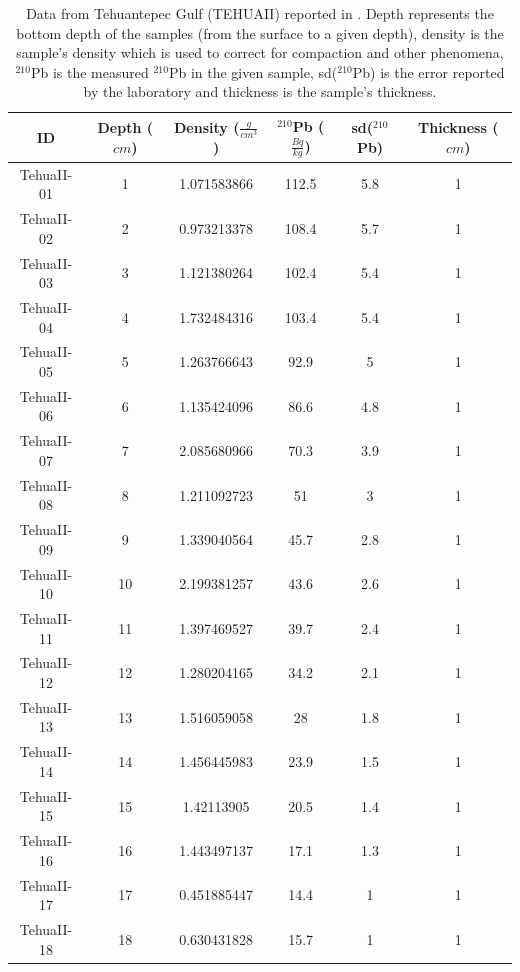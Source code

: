 \documentclass [10pt] {article}
\begin{document}
\begin{table}
\centering
    \begin{tabular}{|c| c| c| c| c| c|}
\hline
	    ID  & Depth ($cm$)  & Density ($\frac{g}{cm^3}$)  & $^{210}$Pb ($\frac{Bq}{kg}$) & sd($^{210}$Pb)  & Thickness ($cm$) \\
\hline
TehuaII-01  & 1  & 1.071583866  & 112.5  & 5.8  & 1\\
TehuaII-02  & 2  & 0.973213378  & 108.4  & 5.7  & 1\\
TehuaII-03  & 3  & 1.121380264  & 102.4  & 5.4  & 1\\
TehuaII-04  & 4  & 1.732484316  & 103.4  & 5.4  & 1\\
TehuaII-05  & 5  & 1.263766643  & 92.9  & 5  & 1\\
TehuaII-06  & 6  & 1.135424096  & 86.6  & 4.8  & 1\\
TehuaII-07  & 7  & 2.085680966  & 70.3  & 3.9  & 1\\
TehuaII-08  & 8  & 1.211092723  & 51  & 3  & 1\\
TehuaII-09  & 9  & 1.339040564  & 45.7  & 2.8  & 1\\
TehuaII-10  & 10  & 2.199381257  & 43.6  & 2.6  & 1\\
TehuaII-11  & 11  & 1.397469527  & 39.7  & 2.4  & 1\\
TehuaII-12  & 12  & 1.280204165  & 34.2  & 2.1  & 1\\
TehuaII-13  & 13  & 1.516059058  & 28  & 1.8  & 1\\
TehuaII-14  & 14  & 1.456445983  & 23.9  & 1.5  & 1\\
TehuaII-15  & 15  & 1.42113905  & 20.5  & 1.4  & 1\\
\hline
TehuaII-16  & 16  & 1.443497137  & 17.1  & 1.3  & 1\\
TehuaII-17  & 17  & 0.451885447  & 14.4  & 1  & 1\\
TehuaII-18  & 18  & 0.630431828  & 15.7  & 1  & 1\\
\hline
    \end{tabular}
	\caption{Data from Tehuantepec Gulf (TEHUAII) reported in \citet{Sanchez-Cabeza2012}. Depth represents the bottom depth of the samples (from the surface to a given depth), density is the sample's density which is used to correct for compaction and other phenomena, $^{210}$Pb is the measured $^{210}$Pb in the given sample, sd($^{210}$Pb) is the error reported by the laboratory and thickness is the sample's thickness.  }
	\label{tab:tehuaii}
\end{table}
\end{document}

